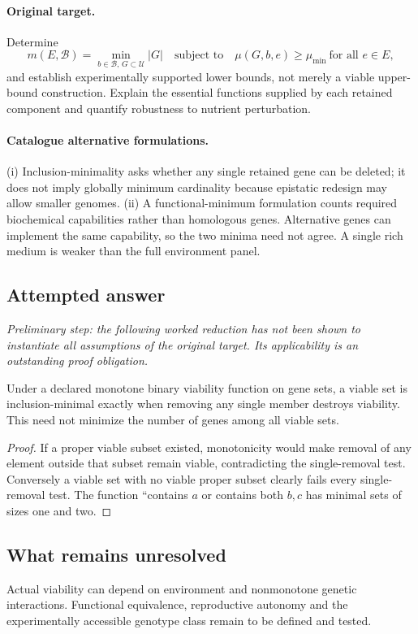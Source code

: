 \documentclass[11pt]{article}
\begin{document}
\paragraph{Original target.}
Determine
\[
 m(E,\mathcal B)=\min_{b\in\mathcal B,\,G\subset\mathcal U}
 |G|\quad\text{subject to}\quad
 \mu(G,b,e)\geq\mu_{\min}\ \text{for all }e\in E,
\]
and establish experimentally supported lower bounds, not merely a viable upper-bound construction. Explain the essential functions supplied by each retained component and quantify robustness to nutrient perturbation.
\paragraph{Catalogue alternative formulations.}
(i) Inclusion-minimality asks whether any single retained gene can be deleted; it does not imply globally minimum cardinality because epistatic redesign may allow smaller genomes. (ii) A functional-minimum formulation counts required biochemical capabilities rather than homologous genes. Alternative genes can implement the same capability, so the two minima need not agree. A single rich medium is weaker than the full environment panel.
\subsection{Attempted answer}
\noindent\emph{Preliminary step: the following worked reduction has not been shown to instantiate all assumptions of the original target. Its applicability is an outstanding proof obligation.}

\begin{proposition}
Under a declared monotone binary viability function on gene sets, a viable set is inclusion-minimal exactly when removing any single member destroys viability. This need not minimize the number of genes among all viable sets.
\end{proposition}
\begin{proof}
If a proper viable subset existed, monotonicity would make removal of any element outside that subset remain viable, contradicting the single-removal test. Conversely a viable set with no viable proper subset clearly fails every single-removal test. The function ``contains $a$ or contains both $b,c$ has minimal sets of sizes one and two.
\end{proof}
\subsection{What remains unresolved}
Actual viability can depend on environment and nonmonotone genetic interactions. Functional equivalence, reproductive autonomy and the experimentally accessible genotype class remain to be defined and tested.
\end{document}
